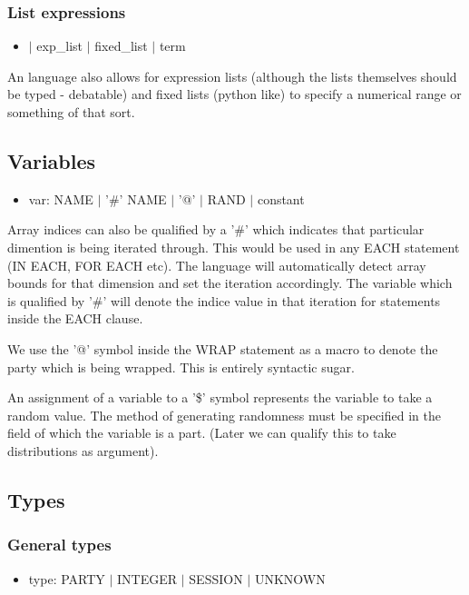 \subsubsection{List expressions}
\begin{itemize}
\item $|$ exp\_list $|$ fixed\_list $|$ term
\end{itemize}
An language also allows for expression lists (although the lists themselves should be typed - debatable) and fixed lists (python like) to specify a numerical range or something of that sort.

\subsection{Variables}
\begin{itemize}
\item var: NAME $|$ '\#' NAME $|$ '@' $|$ RAND $|$ constant
\end{itemize}

Array indices can also be qualified by a '\#' which indicates that particular dimention is being iterated through. This would be used in any EACH statement (IN EACH, FOR EACH etc). The language will automatically detect array bounds for that dimension and set the iteration accordingly. The variable which is qualified by '\#' will denote the indice value in that iteration for statements inside the EACH clause.

We use the '@' symbol inside the WRAP statement as a macro to denote the party which is being wrapped. This is entirely syntactic sugar.

An assignment of a variable to a '\$' symbol represents the variable to take a random value. The method of generating randomness must be specified in the field of which the variable is a part. (Later we can qualify this to take distributions as argument).

\subsection{Types}

\subsubsection{General types}
\begin{itemize}
\item type: PARTY $|$ INTEGER $|$ SESSION $|$ UNKNOWN
\end{itemize}

